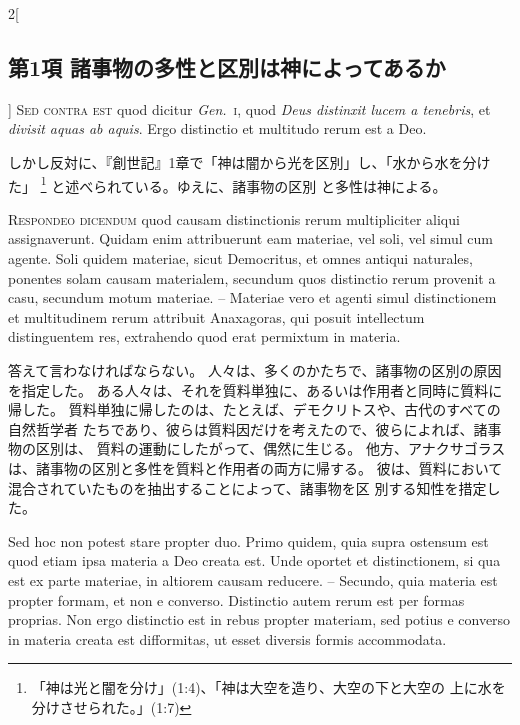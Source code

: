 \documentclass[paper=a4paper,fontsize=10pt,jafontsize=9pt,titlepage]{jlreq}
\begin{document}
\begin{paracol}{2}[\subsection{第1項 諸事物の多性と区別は神によってあるか}]
{\scshape Sed contra est} quod dicitur {\itshape Gen.}~{\scshape i}, quod {\itshape Deus
 distinxit lucem a tenebris}, et {\itshape divisit aquas ab aquis}. Ergo
 distinctio et multitudo rerum est a Deo.


\switchcolumn


しかし反対に、『創世記』1章で「神は闇から光を区別」し、「水から水を分けた」
 \footnote{「神は光と闇を分け」(1:4)、「神は大空を造り、大空の下と大空の
 上に水を分けさせられた。」(1:7)} と述べられている。ゆえに、諸事物の区別
 と多性は神による。




{\scshape Respondeo dicendum} quod causam distinctionis
 rerum multipliciter aliqui assignaverunt. Quidam enim attribuerunt eam
 materiae, vel soli, vel simul cum agente. Soli quidem materiae, sicut
 Democritus, et omnes antiqui naturales, ponentes solam causam
 materialem, secundum quos distinctio rerum provenit a casu, secundum
 motum materiae. -- Materiae vero et agenti simul distinctionem et
 multitudinem rerum attribuit Anaxagoras, qui posuit intellectum
 distinguentem res, extrahendo quod erat permixtum in materia.


\switchcolumn


答えて言わなければならない。
人々は、多くのかたちで、諸事物の区別の原因を指定した。
ある人々は、それを質料単独に、あるいは作用者と同時に質料に帰した。
質料単独に帰したのは、たとえば、デモクリトスや、古代のすべての自然哲学者
 たちであり、彼らは質料因だけを考えたので、彼らによれば、諸事物の区別は、
 質料の運動にしたがって、偶然に生じる。
他方、アナクサゴラスは、諸事物の区別と多性を質料と作用者の両方に帰する。
 彼は、質料において混合されていたものを抽出することによって、諸事物を区
 別する知性を措定した。


\switchcolumn*


Sed hoc
 non potest stare propter duo. Primo quidem, quia supra ostensum est
 quod etiam ipsa materia a Deo creata est. Unde oportet et
 distinctionem, si qua est ex parte materiae, in altiorem causam
 reducere. -- Secundo, quia materia est propter formam, et non e
 converso. Distinctio autem rerum est per formas proprias. Non ergo
 distinctio est in rebus propter materiam, sed potius e converso in
 materia creata est difformitas, ut esset diversis formis
 accommodata.


\switchcolumn



\end{paracol}
\end{document}
